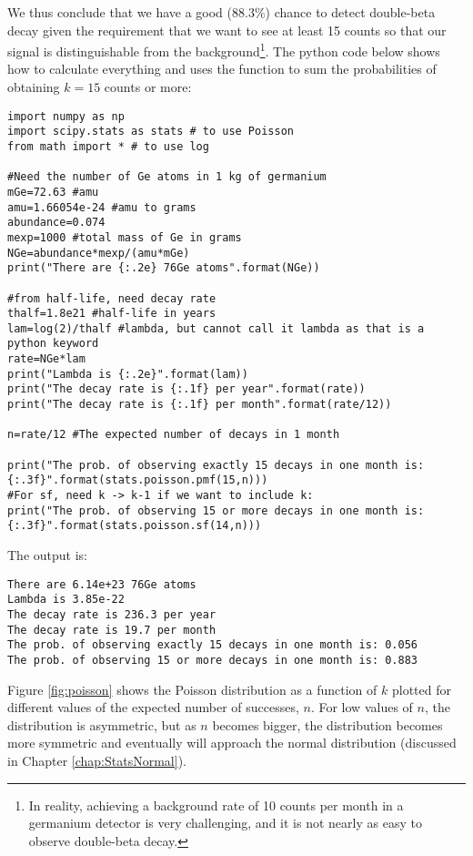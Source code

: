 \begin{example}{}
We thus conclude that we have a good (88.3\%) chance to detect double-beta decay given the requirement that we want to see at least 15 counts so that our signal is distinguishable from the background\footnote{In reality, achieving a background rate of 10 counts per month in a germanium detector is very challenging, and it is not nearly as easy to observe double-beta decay.}. The python code below shows how to calculate everything and uses the function  to sum the probabilities of obtaining $k=15$ counts or more:
\begin{lstlisting}[frame=single] 
import numpy as np
import scipy.stats as stats # to use Poisson
from math import * # to use log

#Need the number of Ge atoms in 1 kg of germanium
mGe=72.63 #amu
amu=1.66054e-24 #amu to grams
abundance=0.074
mexp=1000 #total mass of Ge in grams
NGe=abundance*mexp/(amu*mGe)
print("There are {:.2e} 76Ge atoms".format(NGe))

#from half-life, need decay rate
thalf=1.8e21 #half-life in years
lam=log(2)/thalf #lambda, but cannot call it lambda as that is a python keyword
rate=NGe*lam
print("Lambda is {:.2e}".format(lam))
print("The decay rate is {:.1f} per year".format(rate))
print("The decay rate is {:.1f} per month".format(rate/12))

n=rate/12 #The expected number of decays in 1 month

print("The prob. of observing exactly 15 decays in one month is: {:.3f}".format(stats.poisson.pmf(15,n)))
#For sf, need k -> k-1 if we want to include k:
print("The prob. of observing 15 or more decays in one month is: {:.3f}".format(stats.poisson.sf(14,n)))
\end{lstlisting}
The output is:
\begin{verbatim}
There are 6.14e+23 76Ge atoms
Lambda is 3.85e-22
The decay rate is 236.3 per year
The decay rate is 19.7 per month
The prob. of observing exactly 15 decays in one month is: 0.056
The prob. of observing 15 or more decays in one month is: 0.883
\end{verbatim}

\end{example}

Figure \ref{fig:poisson} shows the Poisson distribution as a function of $k$ plotted for different values of the expected number of successes, $n$. For low values of $n$, the distribution is asymmetric, but as $n$ becomes bigger, the distribution becomes more symmetric and eventually will approach the normal distribution (discussed in Chapter \ref{chap:StatsNormal}).

